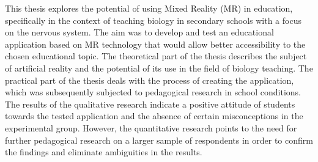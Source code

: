 This thesis explores the potential of using Mixed Reality (MR) in education, specifically in the context of teaching biology in secondary schools with a focus on the nervous system. 
The aim was to develop and test an educational application based on MR technology that would allow better accessibility to the chosen educational topic.
The theoretical part of the thesis describes the subject of artificial reality and the potential of its use in the field of biology teaching.
The practical part of the thesis deals with the process of creating the application, which was subsequently subjected to pedagogical research in school conditions.
The results of the qualitative research indicate a positive attitude of students towards the tested application and the absence of certain misconceptions in the experimental group. 
However, the quantitative research points to the need for further pedagogical research on a larger sample of respondents in order to confirm the findings and eliminate ambiguities in the results.